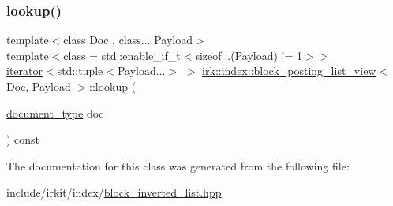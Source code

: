 \mbox{\label{classirk_1_1index_1_1block__posting__list__view_a8a777f2895961f7cc792a118c909cd78}} 
\subsubsection{\texorpdfstring{lookup()}{lookup()}\hspace{0.1cm}{\footnotesize\ttfamily [2/2]}}
{\footnotesize\ttfamily template$<$class Doc , class... Payload$>$ \\
template$<$class  = std\+::enable\+\_\+if\+\_\+t$<$sizeof...(\+Payload) != 1$>$$>$ \\
\mbox{\hyperlink{classirk_1_1index_1_1block__posting__list__view_1_1iterator}{iterator}}$<$std\+::tuple$<$Payload...$>$ $>$ \mbox{\hyperlink{classirk_1_1index_1_1block__posting__list__view}{irk\+::index\+::block\+\_\+posting\+\_\+list\+\_\+view}}$<$ Doc, Payload $>$\+::lookup (\begin{DoxyParamCaption}\item[{\mbox{\hyperlink{classirk_1_1index_1_1block__posting__list__view_a4a778116d22c9cf347f38da132ca0900}{document\+\_\+type}}}]{doc }\end{DoxyParamCaption}) const\hspace{0.3cm}{\ttfamily [inline]}}



The documentation for this class was generated from the following file\+:\begin{DoxyCompactItemize}
\item 
include/irkit/index/\mbox{\hyperlink{block__inverted__list_8hpp}{block\+\_\+inverted\+\_\+list.\+hpp}}\end{DoxyCompactItemize}
